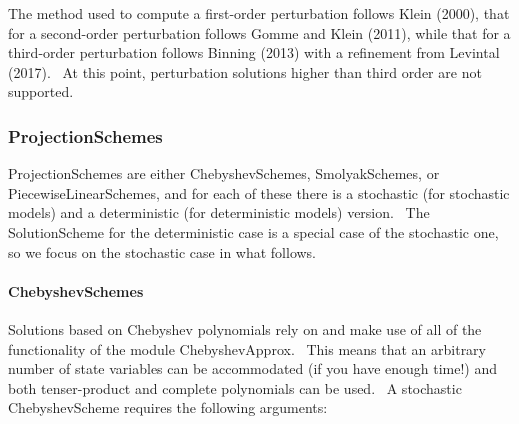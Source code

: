 \documentclass[notitlepage,11pt]{article}
\begin{document}
The method used to compute a first-order perturbation follows Klein (2000),
that for a second-order perturbation follows Gomme and Klein (2011), while
that for a third-order perturbation follows Binning (2013) with a refinement
from Levintal (2017). \ At this point, perturbation solutions higher than
third order are not supported.

\subsubsection{ProjectionSchemes}

ProjectionSchemes are either ChebyshevSchemes, SmolyakSchemes, or
PiecewiseLinearSchemes, and for each of these there is a stochastic (for
stochastic models) and a deterministic (for deterministic models) version. \
The SolutionScheme for the deterministic case is a special case of the
stochastic one, so we focus on the stochastic case in what follows.

\paragraph{ChebyshevSchemes}

Solutions based on Chebyshev polynomials rely on and make use of all of the
functionality of the module ChebyshevApprox. \ This means that an arbitrary
number of state variables can be accommodated (if you have enough time!) and
both tenser-product and complete polynomials can be used. \ A stochastic
ChebyshevScheme requires the following arguments:
\end{document}
